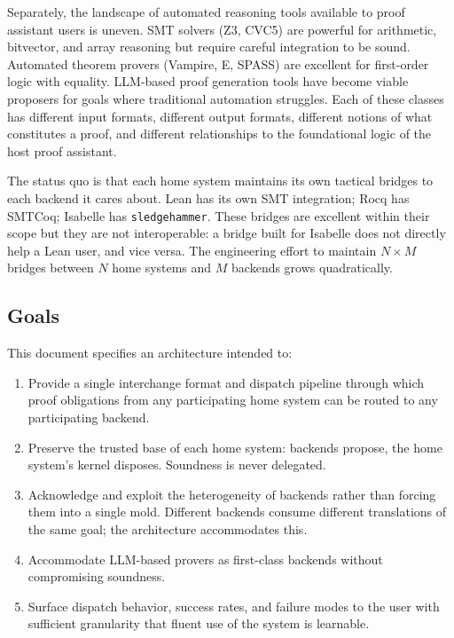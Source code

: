 \documentclass[11pt,letterpaper]{article}
\theoremstyle{definition}
\theoremstyle{remark}
\begin{document}
Separately, the landscape of automated reasoning tools available to proof
assistant users is uneven. SMT solvers (Z3, CVC5) are powerful for arithmetic,
bitvector, and array reasoning but require careful integration to be sound.
Automated theorem provers (Vampire, E, SPASS) are excellent for first-order
logic with equality. LLM-based proof generation tools have become viable
proposers for goals where traditional automation struggles. Each of these
classes has different input formats, different output formats, different
notions of what constitutes a proof, and different relationships to the
foundational logic of the host proof assistant.

The status quo is that each home system maintains its own tactical bridges to
each backend it cares about. Lean has its own SMT integration; Rocq has
SMTCoq; Isabelle has \texttt{sledgehammer}. These bridges are excellent within
their scope but they are not interoperable: a bridge built for Isabelle does
not directly help a Lean user, and vice versa. The engineering effort to
maintain $N \times M$ bridges between $N$ home systems and $M$ backends grows
quadratically.

\subsection{Goals}

This document specifies an architecture intended to:

\begin{enumerate}[leftmargin=2em]
  \item Provide a single interchange format and dispatch pipeline through
        which proof obligations from any participating home system can be
        routed to any participating backend.
  \item Preserve the trusted base of each home system: backends propose,
        the home system's kernel disposes. Soundness is never delegated.
  \item Acknowledge and exploit the heterogeneity of backends rather than
        forcing them into a single mold. Different backends consume different
        translations of the same goal; the architecture accommodates this.
  \item Accommodate LLM-based provers as first-class backends without
        compromising soundness.
  \item Surface dispatch behavior, success rates, and failure modes to the
        user with sufficient granularity that fluent use of the system is
        learnable.
\end{enumerate}
\end{document}
